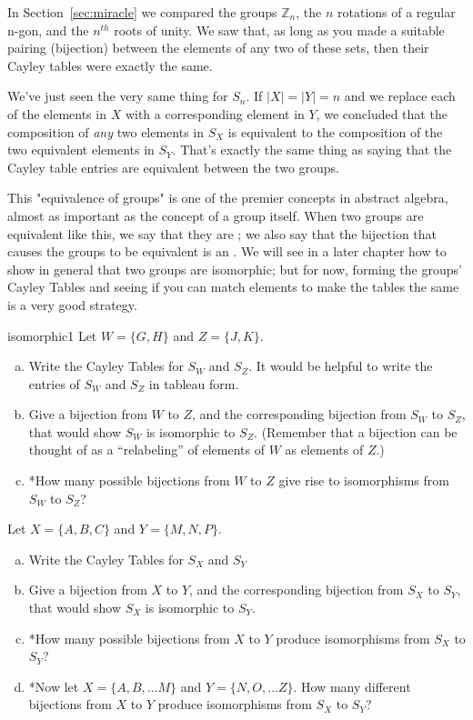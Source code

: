 In Section~\ref{sec:miracle} we compared the groups $\mathbb{Z}_n$, the $n$ rotations of a regular n-gon, and the $n^{th}$ roots of unity.  We saw that, as long as you made a suitable pairing (bijection) between the elements of any two of these sets, then their Cayley tables were exactly the same. 

We've just seen the very same thing for $S_n$. If  $|X| = |Y| = n$ and we replace each of the elements in $X$ with a corresponding element in $Y$, we concluded that the composition of \emph{any} two elements in $S_X$ is equivalent to the composition of the two equivalent elements in $S_Y$.  That's exactly the same thing as saying that  the Cayley table entries are equivalent between the two groups.

This "equivalence of groups" is one of the premier concepts in abstract algebra, almost as important as the concept of a group  itself.  When two groups are equivalent like this, we say that they are ; we also say that the bijection that causes the groups to be equivalent is an .  We will see in a later chapter how to show in general that two groups are isomorphic; but for now, forming the groups' Cayley Tables and seeing if you can match elements to make the tables the same is a very good strategy.

\begin{exercise}{isomorphic1}
Let $W =\{G, H \}$ and $Z = \{J, K \}$.
\begin{enumerate}[(a)]
\item
Write the Cayley Tables for $S_W$ and $S_Z$. It would be helpful to write the entries of $S_W$ and $S_Z$ in tableau form. 
\item
Give a bijection from $W$ to $Z$, and the corresponding bijection from $S_W$ to $S_Z$, that would show $S_W$ is isomorphic to $S_Z$. (Remember that a bijection can be thought of as  a ``relabeling'' of elements of $W$ as elements of $Z$.)
\item
*How many possible bijections from $W$ to $Z$ give rise to isomorphisms from  $S_W$ to  $S_Z$?
\end{enumerate}
\end{exercise}


\begin{exercise}{11}
Let $X =\{A, B, C\}$ and $Y = \{M, N, P\}$.
\begin{enumerate}[(a)]
\item
Write the Cayley Tables for $S_X$ and $S_Y$
\item
Give a bijection from $X$ to $Y$, and the corresponding bijection from $S_X$ to $S_Y$, that would show $S_X$ is isomorphic to $S_Y$.
\item
*How many possible bijections from $X$ to $Y$ produce isomorphisms from $S_X$ to $S_Y$?
\item
*Now let $X =\{A, B, \ldots M\}$ and $Y = \{N, O, \ldots Z\}$. How many different bijections from $X$ to $Y$ produce isomorphisms from $S_X$ to $S_Y$?

\end{enumerate}
\end{exercise}

